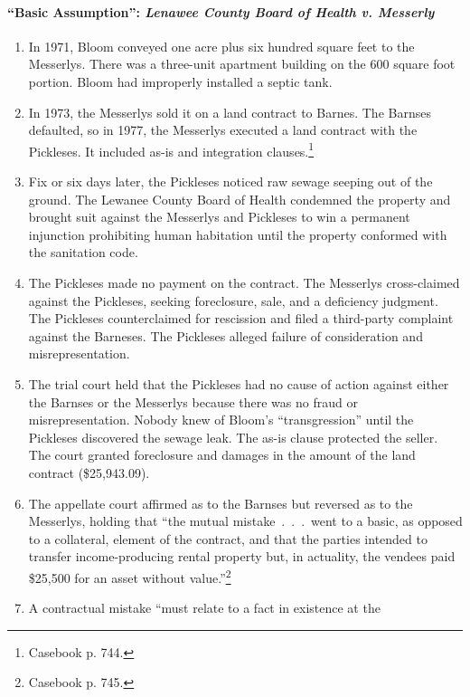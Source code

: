 \paragraph{``Basic Assumption'': \emph{Lenawee County Board of Health v. 
Messerly}}

\begin{enumerate}
    \item In 1971, Bloom conveyed one acre plus six hundred square feet to the 
    Messerlys. There was a three-unit apartment building on the 600 square 
    foot portion. Bloom had improperly installed a septic tank.
    \item In 1973, the Messerlys sold it on a land contract to Barnes. The 
    Barnses defaulted, so in 1977, the Messerlys executed a land contract with 
    the Pickleses. It included as-is and integration 
    clauses.\footnote{Casebook p. 744.}
    \item Fix or six days later, the Pickleses noticed raw sewage seeping out 
    of the ground. The Lewanee County Board of Health condemned the property 
    and brought suit against the Messerlys and Pickleses to win a permanent 
    injunction prohibiting human habitation until the property conformed with 
    the sanitation code.
    \item The Pickleses made no payment on the contract. The Messerlys 
    cross-claimed against the Pickleses, seeking foreclosure, sale, and a 
    deficiency judgment. The Pickleses counterclaimed for rescission and filed 
    a third-party complaint against the Barneses. The Pickleses alleged 
    failure of consideration and misrepresentation.
    \item The trial court held that the Pickleses had no cause of action 
    against either the Barnses or the Messerlys because there was no fraud or 
    misrepresentation. Nobody knew of Bloom's ``transgression'' until the 
    Pickleses discovered the sewage leak. The as-is clause protected the 
    seller. The court granted foreclosure and damages in the amount of the 
    land contract (\$25,943.09).
    \item The appellate court affirmed as to the Barnses but reversed as to 
    the Messerlys, holding that ``the mutual mistake~.~.~.~went to a basic, as 
    opposed to a collateral, element of the contract, and that the parties 
    intended to transfer income-producing rental property but, in actuality, 
    the vendees paid \$25,500 for an asset without value.''\footnote{Casebook 
    p. 745.}
    \item A contractual mistake ``must relate to a fact in existence at the 

\end{enumerate}
